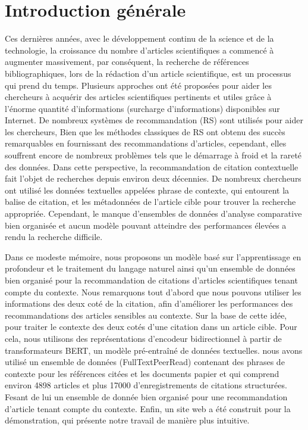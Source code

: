 \chapter*{\textbf{Introduction générale}}

\par Ces dernières années, avec le développement continu de la science et de la technologie, la croissance du  nombre d'articles scientifiques a commencé à augmenter massivement, par conséquent, la recherche de références bibliographiques, lors de la rédaction d'un article scientifique, est un processus qui prend du temps. Plusieurs approches ont été proposées pour aider les chercheurs à acquérir des articles scientifiques pertinents et utiles grâce à l'énorme quantité d'informations (surcharge d'informations) disponibles sur Internet. De nombreux systèmes de recommandation (RS) sont utilisés pour aider les chercheurs, Bien que les méthodes classiques de RS ont obtenu des succès remarquables en fournissant des recommandations d'articles, cependant, elles souffrent encore de nombreux problèmes tels que le démarrage à froid et la rareté des données. Dans cette perspective, la recommandation de citation contextuelle fait l'objet de recherches depuis environ deux décennies. De nombreux chercheurs ont utilisé les données textuelles appelées phrase de contexte, qui entourent la balise de citation, et les métadonnées de l'article cible pour trouver la recherche appropriée. Cependant, le manque d'ensembles de données d'analyse comparative bien organisée et aucun modèle pouvant atteindre des performances élevées a rendu la recherche difficile. 

\par Dans ce modeste mémoire, nous proposons un modèle basé sur l'apprentissage en profondeur et le traitement du langage naturel ainsi qu'un ensemble de données bien organisé pour la recommandation de citations d'articles scientifiques tenant compte du contexte. Nous remarquons tout d'abord que nous pouvons utiliser les informations des deux coté de la citation, afin d'améliorer les performances des recommandations des articles sensibles au contexte. Sur la base de cette idée, pour traiter le contexte des deux cotés d'une citation dans un article cible. Pour cela, nous utilisons des représentations d'encodeur bidirectionnel à partir de transformateurs BERT\cite{ch2bert}, un modèle pré-entraîné de données textuelles. nous avons utilisé un ensemble de données (FullTextPeerRead) contenant des phrases de contexte pour les références citées et les documents papier et qui comprend environ 4898 articles et plus 17000 d'enregistrements de citations structurées. Fesant de lui un ensemble de donnée bien organisé pour une recommandation d'article tenant compte du contexte. Enfin, un site web a été construit pour la démonstration, qui présente notre travail de manière plus intuitive.

